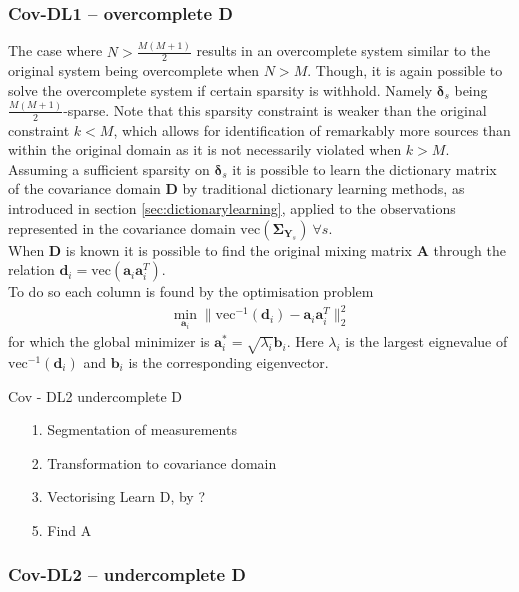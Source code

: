 \subsubsection*{Cov-DL1 -- overcomplete \textbf{D}}
The case where $N > \frac{M(M+1)}{2}$ results in an overcomplete system similar to the original system being overcomplete when $N>M$. 
Though, it is again possible to solve the overcomplete system if certain sparsity is withhold. Namely $\boldsymbol{\delta}_s$ being  $\frac{M(M+1)}{2}$-sparse. Note that this sparsity constraint is  weaker than the original constraint $k<M$, which allows for identification of remarkably more sources than within the original domain as it is not necessarily violated when $k>M$.
Assuming a sufficient sparsity on $\boldsymbol{\delta}_s$ it is possible to learn the dictionary matrix of the covariance domain $\textbf{D}$ by traditional dictionary learning methods, as introduced in section \ref{sec:dictionarylearning}, applied to the observations represented in the covariance domain $\text{vec}(\boldsymbol{\Sigma}_{\mathbf{Y}_s})\ \forall s$.\\
When $\textbf{D}$ is known it is possible to find the original mixing matrix $\textbf{A}$ through the relation $\textbf{d}_i=\text{vec}(\textbf{a}_i\textbf{a}_i^T)$.\\
To do so each column is found by the optimisation problem 
\begin{align*}
\min_{\textbf{a}_i} \| \text{vec}^{-1}(\textbf{d}_i) -\textbf{a}_i\textbf{a}_i^T\|_2^2  
\end{align*}
for which the global minimizer is $\textbf{a}^{\ast}_i=\sqrt{\lambda_i}\textbf{b}_i$. Here $\lambda_i$ is the largest eignevalue of $\text{vec}^{-1}(\textbf{d}_i)$ and $\textbf{b}_i$ is the corresponding eigenvector.
  
  
\begin{algorithm}[H]
\caption{Cov - DL2 undercomplete D}
\begin{itemize}
\item[1.] Segmentation of measurements 
\item[2.] Transformation to covariance domain
\item[3.] Vectorising 
\itme[4.] Learn D, by ?
\item[5.] Find A
\end{itemize}
\end{algorithm}




\subsubsection*{Cov-DL2 -- undercomplete \textbf{D}}




